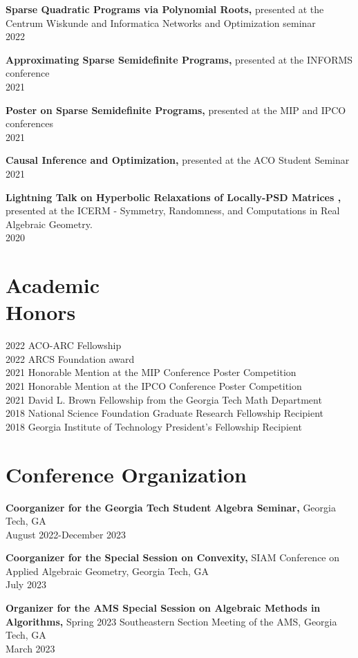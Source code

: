 \documentclass[margin]{res}
\begin{document}
\begin{resume}
{\bf  Sparse Quadratic Programs via Polynomial Roots,} presented at the Centrum Wiskunde and Informatica Networks and Optimization seminar \\ 2022 

{\bf  Approximating Sparse Semidefinite Programs,} presented at the INFORMS conference \\ 2021 

{\bf  Poster on Sparse Semidefinite Programs,} presented at the MIP and IPCO conferences \\ 2021 

{\bf  Causal Inference and Optimization,} presented at the ACO Student Seminar \\ 2021

{\bf  Lightning Talk on Hyperbolic Relaxations of Locally-PSD Matrices ,} presented at the ICERM - Symmetry, Randomness, and Computations in Real Algebraic Geometry.
 \\ 2020



\section{Academic \\ Honors} 
2022 ACO-ARC Fellowship\\
2022 ARCS Foundation award\\
2021 Honorable Mention at the MIP Conference Poster Competition\\
2021 Honorable Mention at the IPCO Conference Poster Competition\\
2021 David L. Brown Fellowship from the Georgia Tech Math Department\\
2018 National Science Foundation Graduate Research Fellowship Recipient\\
2018 Georgia Institute of Technology President's Fellowship Recipient

\section{Conference Organization}
{\bf Coorganizer for the Georgia Tech Student Algebra Seminar,} Georgia Tech, GA    \\       August 2022-December 2023

{\bf Coorganizer for the Special Session on Convexity,} SIAM Conference on Applied Algebraic Geometry, Georgia Tech, GA    \\       July 2023

{\bf Organizer for the AMS Special Session on Algebraic Methods in Algorithms,} Spring 2023 Southeastern Section Meeting of the AMS, Georgia Tech, GA    \\       March 2023


\end{resume}
\end{document}
